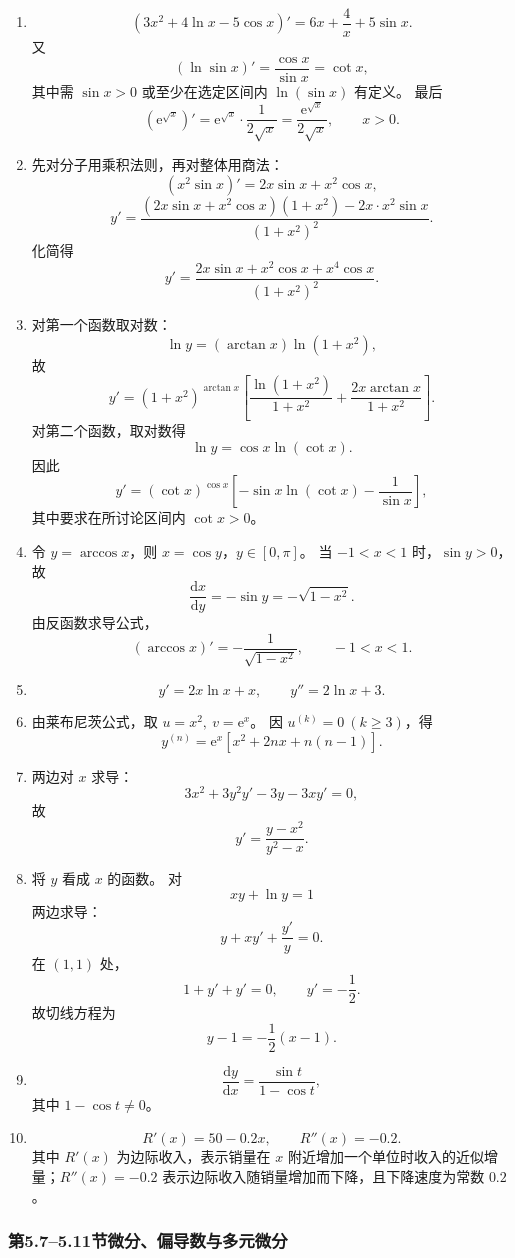 \documentclass[fontset=fandol]{ctexart}
\newcommand{\dd}{\mathrm{d}}
\newcommand{\ee}{\mathrm{e}}
\begin{document}
\begin{enumerate}[label=\textbf{练习\arabic*.},leftmargin=2.2em]
\item
\[
(3x^2+4\ln x-5\cos x)'=6x+\frac4x+5\sin x.
\]
又
\[
(\ln\sin x)'=\frac{\cos x}{\sin x}=\cot x,
\]
其中需 $\sin x>0$ 或至少在选定区间内 $\ln(\sin x)$ 有定义。 最后
\[
(\ee^{\sqrt{x}})'=\ee^{\sqrt{x}}\cdot\frac1{2\sqrt{x}}
=\frac{\ee^{\sqrt{x}}}{2\sqrt{x}},\qquad x>0.
\]
\item 先对分子用乘积法则，再对整体用商法：
\[
\left(x^2\sin x\right)'=2x\sin x+x^2\cos x,
\]
\[
y'=\frac{(2x\sin x+x^2\cos x)(1+x^2)-2x\cdot x^2\sin x}{(1+x^2)^2}.
\]
化简得
\[
y'=\frac{2x\sin x+x^2\cos x+x^4\cos x}{(1+x^2)^2}.
\]
\item 对第一个函数取对数：
\[
\ln y=(\arctan x)\ln(1+x^2),
\]
故
\[
y'=(1+x^2)^{\arctan x}\left[\frac{\ln(1+x^2)}{1+x^2}+\frac{2x\arctan x}{1+x^2}\right].
\]
对第二个函数，取对数得
\[
\ln y=\cos x\ln(\cot x).
\]
因此
\[
y'=(\cot x)^{\cos x}\left[-\sin x\ln(\cot x)-\frac1{\sin x}\right],
\]
其中要求在所讨论区间内 $\cot x>0$。
\item 令 $y=\arccos x$，则 $x=\cos y$，$y\in[0,\pi]$。 当 $-1<x<1$ 时，$\sin y>0$，故
\[
\frac{\dd x}{\dd y}=-\sin y=-\sqrt{1-x^2}.
\]
由反函数求导公式，
\[
(\arccos x)'=-\frac1{\sqrt{1-x^2}},\qquad -1<x<1.
\]
\item
\[
y'=2x\ln x+x,\qquad y''=2\ln x+3.
\]
\item 由莱布尼茨公式，取 $u=x^2,\ v=\ee^x$。 因 $u^{(k)}=0\ (k\geq3)$，得
\[
y^{(n)}=\ee^x\left[x^2+2nx+n(n-1)\right].
\]
\item 两边对 $x$ 求导：
\[
3x^2+3y^2y'-3y-3xy'=0,
\]
故
\[
y'=\frac{y-x^2}{y^2-x}.
\]
\item 将 $y$ 看成 $x$ 的函数。 对
\[
xy+\ln y=1
\]
两边求导：
\[
y+xy'+\frac{y'}{y}=0.
\]
在 $(1,1)$ 处，
\[
1+y'+y'=0,\qquad y'=-\frac12.
\]
故切线方程为
\[
y-1=-\frac12(x-1).
\]
\item
\[
\frac{\dd y}{\dd x}=\frac{\sin t}{1-\cos t},
\]
其中 $1-\cos t\neq0$。
\item
\[
R'(x)=50-0.2x,\qquad R''(x)=-0.2.
\]
其中 $R'(x)$ 为边际收入，表示销量在 $x$ 附近增加一个单位时收入的近似增量；$R''(x)=-0.2$ 表示边际收入随销量增加而下降，且下降速度为常数 $0.2$。
\end{enumerate}

\subsubsection*{第5.7--5.11节\quad 微分、偏导数与多元微分}
\end{document}
